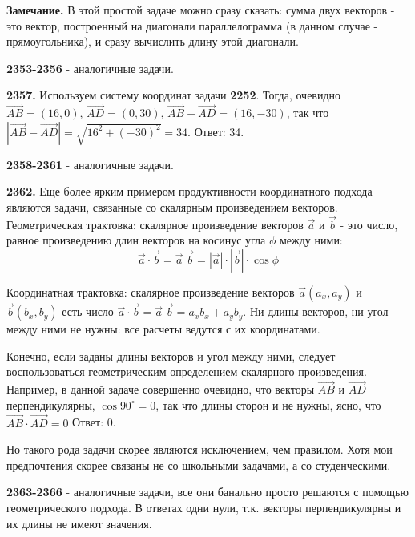 \textbf{Замечание.} В этой простой задаче можно сразу сказать: сумма двух векторов - это вектор, построенный на  диагонали параллелограмма (в данном случае - прямоугольника), и сразу вычислить длину этой диагонали. 

\textbf{2353-2356} - аналогичные задачи.

\textbf{2357.}  Используем систему координат задачи \textbf{2252}. Тогда, очевидно
$\overrightarrow{AB}=(16, 0)$, $\overrightarrow{AD} = (0, 30)$, $\overrightarrow{AB} - \overrightarrow{AD} = (16, -30)$, так что $|\overrightarrow{AB} - \overrightarrow{AD}|=\sqrt{16^2+(-30)^2}=34$. \newline \null \hspace*{\fill} Ответ: 34.

\textbf{2358-2361} - аналогичные задачи.

\textbf{2362.} Еще более ярким примером продуктивности координатного подхода являются задачи, связанные со скалярным произведением векторов. Геометрическая трактовка: скалярное произведение векторов $\overrightarrow{a}$ и $\overrightarrow{b}$ - это число, равное произведению длин векторов на косинус угла $\phi$ между ними:
\[
\vec{a}\cdot \vec{b}=\vec{a}\;
\vec{b}=|\vec{a}|\cdot|\vec{b}|\cdot\cos{\phi}\]

Координатная трактовка: скалярное произведение векторов \linebreak $\vec{a}(a_x, a_y)$ и $\vec{b}(b_x, b_y)$ есть число $\vec{a}\cdot \vec{b}=\vec{a}\;
\vec{b} = a_xb_x+a_yb_y$. Ни длины векторов, ни угол между ними не нужны: все расчеты ведутся с их координатами.

Конечно, если заданы длины векторов и угол между ними, следует воспользоваться геометрическим определением скалярного произведения. Например, в данной задаче совершенно очевидно, что векторы $\overrightarrow{AB}$ и $\overrightarrow{AD}$ перпендикулярны, $\cos{90^\circ}=0$, так что длины сторон и не нужны, ясно, что $\overrightarrow{AB}\cdot\overrightarrow{AD}=0$ \newline \null \hspace*{\fill} Ответ: 0.                       

Но такого рода задачи скорее являются исключением, чем правилом. Хотя мои предпочтения скорее связаны не со школьными задачами, а со студенческими.

\textbf{2363-2366} - аналогичные задачи, все они банально просто решаются с помощью геометрического подхода. В ответах одни нули, т.к. векторы перпендикулярны и их длины не имеют значения.

